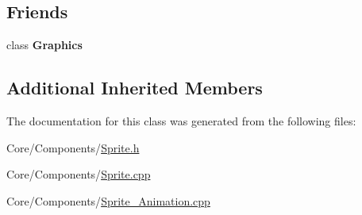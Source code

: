 \subsection*{Friends}
\begin{DoxyCompactItemize}
\item 
\hypertarget{classDCEngine_1_1Components_1_1Sprite_ae5cfe0c0e0b06d536d5814bd1ff4818f}{class {\bfseries Graphics}}\label{classDCEngine_1_1Components_1_1Sprite_ae5cfe0c0e0b06d536d5814bd1ff4818f}

\end{DoxyCompactItemize}
\subsection*{Additional Inherited Members}


The documentation for this class was generated from the following files\-:\begin{DoxyCompactItemize}
\item 
Core/\-Components/\hyperlink{Sprite_8h}{Sprite.\-h}\item 
Core/\-Components/\hyperlink{Sprite_8cpp}{Sprite.\-cpp}\item 
Core/\-Components/\hyperlink{Sprite__Animation_8cpp}{Sprite\-\_\-\-Animation.\-cpp}\end{DoxyCompactItemize}
